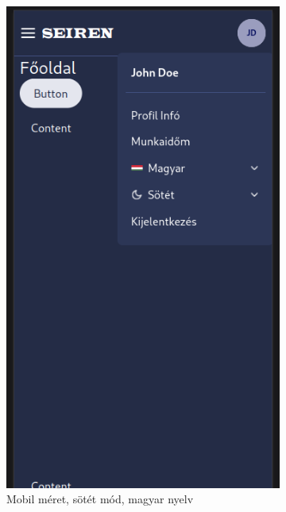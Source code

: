 \documentclass[a4paper]{article}
\begin{document}
\begin{figure}[ht]
    \centering
    \begin{subfigure}[b]{0.45\textwidth}
        \centering
        \includegraphics[height=0.4\textheight]{images/header_mobile.png}
        \caption{Mobil méret, sötét mód, magyar nyelv}
        \label{fig:header_mobile_closed}
    \end{subfigure}
    \hfill
    \begin{subfigure}[b]{0.45\textwidth}
        \centering

\end{subfigure}
\end{figure}
\end{document}
